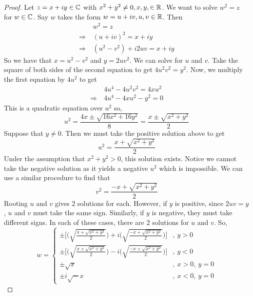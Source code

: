 \documentclass[11pt]{article}
\begin{document}
\begin{proof}
	Let $z = x + iy \in \mathbb{C}$ with $x^2 + y^2 \neq 0, x, y, \in \mathbb{R}$. We want to
	solve $w^2 = z$ for $w \in \mathbb{C}$. Say $w$ takes the form $w = u + iv, u, v \in
	\mathbb{R}$. Then
	\begin{align*}
		& \> w^2 = z\\
		\Rightarrow & \> (u+iv)^2 = x + iy\\
		\Rightarrow & \> (u^2 - v^2) + i2uv = x + iy
	\end{align*}
	So we have that $x = u^2 - v^2$ and $y = 2uv^2$. We can solve for $u$ and
	$v$. Take the square of both sides of the second equation to get $4u^2v^2 =
	y^2$. Now, we multiply the first equation by $4u^2$ to get
	\begin{align*}
		& \> 4u^4 - 4u^2v^2 = 4xu^2\\
		\Rightarrow & \> 4u^4 - 4xu^2 - y^2 = 0
	\end{align*}
	This is a quadratic equation over $u^2$ so,
	\begin{equation*}
		u^2 = \frac{4x \pm \sqrt{16x^2 + 16y^2}}{8} = \frac{x \pm \sqrt{x^2 +
		y^2}}{2}
	\end{equation*}
	Suppose that $y \neq 0$. Then we must take the positive solution above to
	get
	\begin{equation*}
		u^2 = \frac{x + \sqrt{x^2 + y^2}}{2}
	\end{equation*}
	Under the assumption that $x^2 + y^2 > 0$, this solution exists. Notice we
	cannot take the negative solution as it yields a negative $u^2$ which is
	impossible. We can use a similar procedure to find that
	\begin{equation*}
		v^2 = \frac{-x + \sqrt{x^2 + y^2}}{2}
	\end{equation*}
	Rooting $u$ and $v$ gives 2 solutions for each. However, if $y$ is positive,
	since $2uv = y$, $u$ and $v$ must take the same sign. Similarly, if $y$ is
	negative, they must take different signs. In each of these cases, there are
	2 solutions for $u$ and $v$. So,
	\begin{equation*}
		w =
		\begin{cases}
			\pm \Bigg[ \bigg(\sqrt{\frac{x + \sqrt{x^2 + y^2}}{2}}\bigg) +
			i\bigg(\sqrt{\frac{-x + \sqrt{x^2 + y^2}}{2}}\bigg)\Bigg] &, \> y >
			0\\
			\pm \Bigg[ \bigg(\sqrt{\frac{x + \sqrt{x^2 + y^2}}{2}}\bigg) -
			i\bigg(\sqrt{\frac{-x + \sqrt{x^2 + y^2}}{2}}\bigg)\Bigg] &, \> y <
			0\\
			\pm \sqrt x &, \> x > 0,\> y = 0\\
			\pm i\sqrt -x &, \> x < 0,\> y = 0
		\end{cases}
	\end{equation*}
\end{proof}
\end{document}
